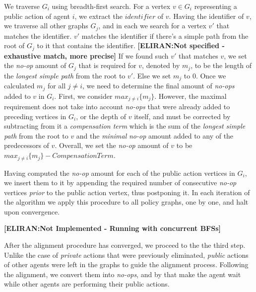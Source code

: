 \documentclass[letterpaper]{article} %
\theoremstyle{definition}
\newcommand{\eliran}[1]{\textbf{[\color{red}ELIRAN:#1]}}
\newcommand{\ronen}[1]{\textbf{[\color{blue}RONEN:#1]}}
\begin{document}
We traverse $G_i$ using breadth-first search. For a vertex $v\in G_i$ representing a public action of agent $i$, we extract the $identifier$ of $v$. Having the identifier of $v$, we traverse all other graphs $G_j$, and in each we search for a vertex $v'$ that matches the identifier. $v'$ matches the identifier if there's a simple path from the root of $G_j$ to it that contains the identifier.
\eliran{Not specified - exhaustive match, more precise}
If we found such $v'$ that matches $v$, we set the {\em no-op} amount of $G_j$ that is required for $v$, denoted by $m_j$, to be the length of the \emph{longest simple path} from the root to $v'$. Else we set $m_j$ to 0.
Once we calculated $m_j$ for all $j\neq i$, we need to determine the final amount of {\em no-ops} added to $v$ in $G_i$. First, we consider $max_{j\neq i}\{m_j\}$. However, the maximal requirement does not take into account {\em no-ops} that were already added to preceding vertices in $G_i$, or the depth of $v$ itself, and must be
corrected by subtracting from it a \emph{compensation term} which is the sum of the \emph{longest simple path} from the root to $v$ and the \emph{minimal} {\em no-op} amount added to any of the predecessors of $v$. Overall, we set the {\em no-op} amount of $v$ to be $max_{j\neq i}\{m_j\} - \mathit{CompensationTerm}$.

Having computed the  {\em no-op} amount for each of the public action vertices in $G_i$, we insert them to it by appending the required number of consecutive {\em no-op} vertices \emph{prior} to the public action vertex, thus postponing it.
In each iteration of the algorithm we apply this procedure to all policy graphs, one by one, and halt upon convergence.

\eliran{Not Implemented - Running with concurrent BFSs}

After the alignment procedure has converged, we proceed to the the third step. Unlike the case of \emph{private} actions that were previously eliminated, \emph{public} actions of other agents were left in the graphs to guide the alignment process. Following the alignment, we convert them into \emph{no-ops}, and by that make the agent wait while other agents are performing their public actions.
\end{document}
